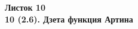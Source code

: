 \documentclass[a4paper, 11pt]{article}
\begin{document}
\begin{center} \Large \bf Листок 10\\ 10 (2.6). Дзета функция Артина \end{center}


\end{document}
